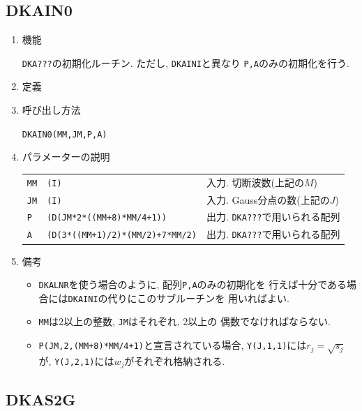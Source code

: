 \documentclass[a4j,fleqn]{jarticle}
\begin{document}
\subsection{DKAIN0}

\begin{enumerate}

\item 機能

{\tt DKA???}の初期化ルーチン. ただし, {\tt DKAINI}と異なり
{\tt P,A}のみの初期化を行う.

\item 定義

\item 呼び出し方法 
    
{\tt DKAIN0(MM,JM,P,A)}
  
\item パラメーターの説明 
    
\begin{tabular}{lll}
{\tt MM} & {\tt (I)} & 入力. 切断波数(上記の$M$)\\
{\tt JM} & {\tt (I)} & 入力. Gauss分点の数(上記の$J$)\\
{\tt P}  & {\tt (D(JM*2*((MM+8)*MM/4+1))} & 出力. {\tt DKA???}で用いられる配列\\
{\tt A}  & {\tt (D(3*((MM+1)/2)*(MM/2)+7*MM/2)} & 出力. {\tt DKA???}で用いられる配列
\end{tabular}

\item 備考

\begin{itemize}

\item {\tt DKALNR}を使う場合のように, 配列{\tt P,A}のみの初期化を
行えば十分である場合には{\tt DKAINI}の代りにこのサブルーチンを
用いればよい.

\item {\tt MM}は2以上の整数, {\tt JM}はそれぞれ, 2以上の
偶数でなければならない.

\item {\tt P(JM,2,(MM+8)*MM/4+1)}と宣言されている場合, 
   {\tt Y(J,1,1)}には$r_j=\sqrt{s_j}$が, 
   {\tt Y(J,2,1)}には$w_j$がそれぞれ格納される.

\end{itemize}

\end{enumerate}


\subsection{DKAS2G}
\end{document}
